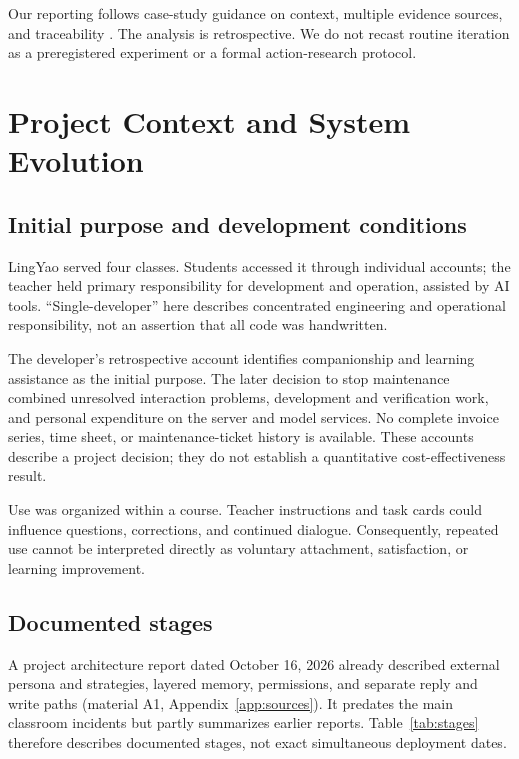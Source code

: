 \documentclass[11pt,a4paper]{article}
\begin{document}
Our reporting follows case-study guidance on context, multiple evidence sources, and traceability \cite{runeson}. The analysis is retrospective. We do not recast routine iteration as a preregistered experiment or a formal action-research protocol.

\section{Project Context and System Evolution}
\subsection{Initial purpose and development conditions}
LingYao served four classes. Students accessed it through individual accounts; the teacher held primary responsibility for development and operation, assisted by AI tools. ``Single-developer'' here describes concentrated engineering and operational responsibility, not an assertion that all code was handwritten.

The developer's retrospective account identifies companionship and learning assistance as the initial purpose. The later decision to stop maintenance combined unresolved interaction problems, development and verification work, and personal expenditure on the server and model services. No complete invoice series, time sheet, or maintenance-ticket history is available. These accounts describe a project decision; they do not establish a quantitative cost-effectiveness result.

Use was organized within a course. Teacher instructions and task cards could influence questions, corrections, and continued dialogue. Consequently, repeated use cannot be interpreted directly as voluntary attachment, satisfaction, or learning improvement.

\subsection{Documented stages}
A project architecture report dated October 16, 2026 already described external persona and strategies, layered memory, permissions, and separate reply and write paths (material A1, Appendix~\ref{app:sources}). It predates the main classroom incidents but partly summarizes earlier reports. Table~\ref{tab:stages} therefore describes documented stages, not exact simultaneous deployment dates.
\end{document}
